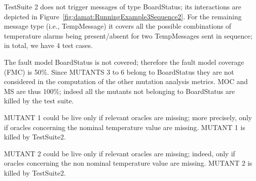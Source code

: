TestSuite 2 does not trigger messages of type BoardStatus; its interactions are depicted in Figure~\ref{fig:damat:RunningExample3Sequence2}. For the remaining message type (i.e., TempMessage) it covers all the possible combinations of temperature alarms being present/absent for two TempMessages sent in sequence; in total, we have 4 test cases.

The fault model BoardStatus is not covered; therefore the fault model coverage (FMC) is 50\%. Since MUTANTS 3 to 6 belong to BoardStatus they are not considered in the computation of the other mutation analysis metrics. MOC and MS are thus 100\%; indeed all the mutants not belonging to BoardStatus are killed by the test suite.

MUTANT 1 could be live only if relevant oracles are missing; more precisely, only if oracles concerning the nominal temperature value are missing. MUTANT 1 is killed by TestSuite2.

MUTANT 2 could be live only if relevant oracles are missing; indeed, only if oracles concerning the non nominal temperature value are missing. MUTANT 2 is killed by TestSuite2.
